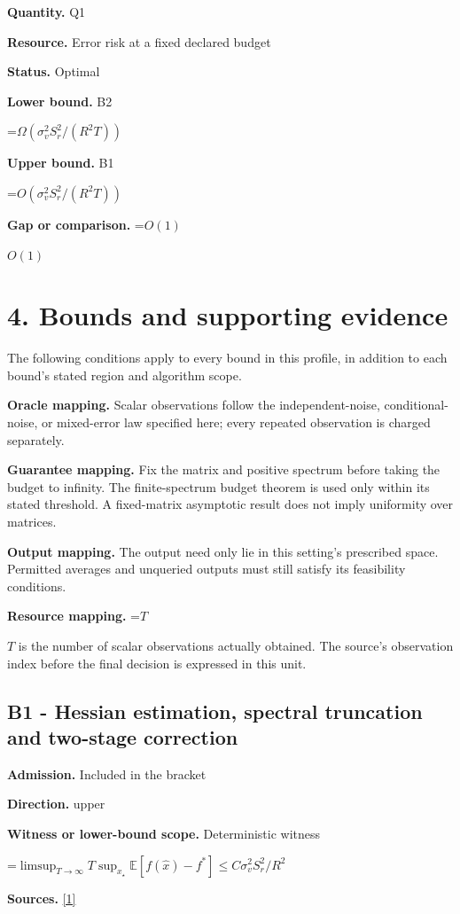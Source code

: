 \documentclass[10pt,a4paper]{article}
\newcommand{\AtlasMath}[1]{\par\begingroup\centering\setbox0=\hbox{$\displaystyle #1$}\ifdim\wd0>1.4\linewidth\typeout{ATLAS WIDE FORMULA: \the\wd0}\fi\ifdim\wd0>\linewidth\resizebox{\linewidth}{!}{\box0}\else\box0\fi\par\endgroup}
\newcommand{\AtlasInlineMath}[1]{\begingroup\setbox0=\hbox{$#1$}\ifdim\wd0>.4\linewidth\endgroup\AtlasMath{#1}\else\endgroup$#1$\fi}
\begin{document}
\textbf{Quantity.} Q1

\textbf{Resource.} Error risk at a fixed declared budget

\textbf{Status.} Optimal

\textbf{Lower bound.} B2

\AtlasMath{\Omega(\sigma_v^2S_r^2/(R^2T))}
\textbf{Upper bound.} B1

\AtlasMath{O(\sigma_v^2S_r^2/(R^2T))}
\textbf{Gap or comparison.} \AtlasInlineMath{O(1)}

\section{4. Bounds and supporting evidence}
The following conditions apply to every bound in this profile, in addition to each bound's stated region and algorithm scope.

\textbf{Oracle mapping.} Scalar observations follow the independent-noise, conditional-noise, or mixed-error law specified here; every repeated observation is charged separately.

\textbf{Guarantee mapping.} Fix the matrix and positive spectrum before taking the budget to infinity. The finite-spectrum budget theorem is used only within its stated threshold. A fixed-matrix asymptotic result does not imply uniformity over matrices.

\textbf{Output mapping.} The output need only lie in this setting's prescribed space. Permitted averages and unqueried outputs must still satisfy its feasibility conditions.

\textbf{Resource mapping.} \AtlasInlineMath{T} is the number of scalar observations actually obtained. The source's observation index before the final decision is expressed in this unit.

\subsection{B1 - Hessian estimation, spectral truncation and two-stage correction}
\textbf{Admission.} Included in the bracket

\textbf{Direction.} upper

\textbf{Witness or lower-bound scope.} Deterministic witness

\AtlasMath{\limsup_{T\to\infty}T\sup_{x_\star}\mathbb{E}[f(\hat{x})-f^*]\le C\sigma_v^2S_r^2/R^2}
\textbf{Sources.} \href{https://proceedings.neurips.cc/paper_files/paper/2023/file/6e60a9023d2c63f7f0856910129ae753-Paper-Conference.pdf}{[1]}
\end{document}
